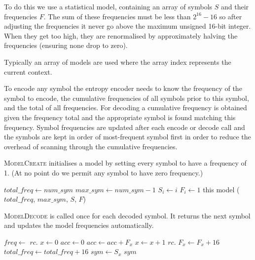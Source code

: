 \documentclass[a4paper]{article}
\begin{document}
To do this we use a statistical model, containing an array of symbols $S$ and their frequencies $F$.
The sum of these frequencies must be less than $2^{16}-16$ so after adjusting the frequencies it never go above the maximum unsigned 16-bit integer.
When they get too high, they are renormalised by approximately halving the frequencies (ensuring none drop to zero).

Typically an array of models are used where the array index represents the current context.

To encode any symbol the entropy encoder needs to know the frequency of the symbol to encode, the cumulative frequencies of all symbols prior to this symbol, and the total of all frequencies.
For decoding a cumulative frequency is obtained given the frequency total and the appropriate symbol is found matching this frequency.
Symbol frequencies are updated after each encode or decode call and the symbols are kept in order of most-frequent symbol first in order to  reduce the overhead of scanning through the cumulative frequencies.

\textsc{ModelCreate} initialises a model by setting every symbol to have a frequency of 1.
(At no point do we permit any symbol to have zero frequency.)

\begin{algorithmic}[1]
  \State $total\_freq \gets num\_sym$
  \State $max\_sym \gets num\_sym-1$
    \State $S_i \gets i$
    \State $F_i \gets 1$
  \EndFor
  \State \Return this model ($total\_freq$, $max\_sym$, $S$, $F$)
\EndFunction
\end{algorithmic}

\textsc{ModelDecode} is called once for each decoded symbol.
It returns the next symbol and updates the model frequencies automatically.

\begin{algorithmic}[1]
  \State $freq \gets$ $rc.$
  \State $x \gets 0$
  \State $acc \gets 0$
    \State $acc \gets acc + F_x$
    \State $x \gets x+1$
  \EndWhile
  \State $rc.$
  \State $F_x \gets F_x + 16$ 
  \State $total\_freq \gets total\_freq + 16$
    \State {}
  \EndIf
  \State $sym \gets S_x$
    \State {}
    \State {}
  \EndIf
  \State \Return $sym$
\EndFunction
\end{algorithmic}
\end{document}
